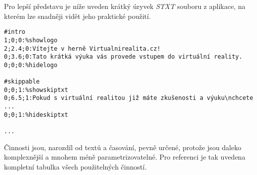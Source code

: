 Pro lepší představu je níže uveden krátký úryvek \emph{STXT} souboru z
aplikace, na kterém lze snadněji vidět jeho praktické použití.

\begin{verbatim}
#intro
1;0;0:%showlogo
2;2.4;0:Vítejte v herně Virtualnirealita.cz!
0;3.6;0:Tato krátká výuka vás provede vstupem do virtuální reality.
0;0;0:%hidelogo

#skippable
0;0;1:%showskiptxt
0;6.5;1:Pokud s virtuální realitou již máte zkušenosti a výuku\nchcete ...
0;0;1:%hideskiptxt

...
\end{verbatim}

Činnosti jsou, narozdíl od textů a časování, pevně určené, protože jsou
daleko komplexnější a mnohem méně parametrizovatelné. Pro referenci je
tak uvedena kompletní tabulka všech použitelných činností.


